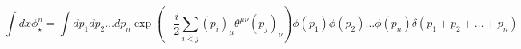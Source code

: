 \begin{equation}
\int dx \phi^n_\star=\int dp_1 dp_2 \ldots dp_n \exp(-\frac{i}{2}\sum_{i<j}(p_i)_\mu\theta^{\mu \nu}(p_j)_\nu) \phi(p_1)\phi(p_2)\ldots\phi(p_n) \delta(p_1+p_2+\ldots+p_n)
\end{equation}

